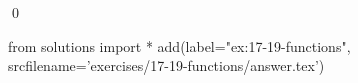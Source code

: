 
\begin{ex}
  \label{ex:17-19-functions}
  
  \qed
\end{ex}
\begin{python0}
from solutions import *
add(label="ex:17-19-functions",
    srcfilename='exercises/17-19-functions/answer.tex')
\end{python0}
